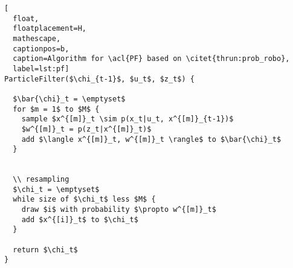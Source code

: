 \begin{lstlisting}[
  float,
  floatplacement=H,
  mathescape,
  captionpos=b,
  caption=Algorithm for \acl{PF} based on \citet{thrun:prob_robo},
  label=lst:pf]
ParticleFilter($\chi_{t-1}$, $u_t$, $z_t$) {

  $\bar{\chi}_t = \emptyset$
  for $m = 1$ to $M$ {
    sample $x^{[m]}_t \sim p(x_t|u_t, x^{[m]}_{t-1})$
    $w^{[m]}_t = p(z_t|x^{[m]}_t)$
    add $\langle x^{[m]}_t, w^{[m]}_t \rangle$ to $\bar{\chi}_t$
  }


  \\ resampling
  $\chi_t = \emptyset$
  while size of $\chi_t$ less $M$ {
    draw $i$ with probability $\propto w^{[m]}_t$
    add $x^{[i]}_t$ to $\chi_t$
  }

  return $\chi_t$
}
\end{lstlisting}
